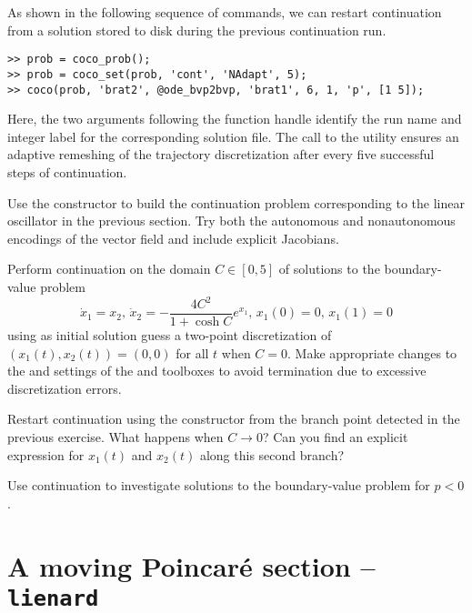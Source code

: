 As shown in the following sequence of commands, we can restart continuation from a solution stored to disk during the previous continuation run. 
\begin{lstlisting}[language=coco-highlight]
>> prob = coco_prob();
>> prob = coco_set(prob, 'cont', 'NAdapt', 5);
>> coco(prob, 'brat2', @ode_bvp2bvp, 'brat1', 6, 1, 'p', [1 5]);
\end{lstlisting}
Here, the two arguments following the  function handle identify the run name and integer label for the corresponding solution file. The call to the  utility ensures an adaptive remeshing of the trajectory discretization after every five successful steps of continuation.\\
\medskip

\begin{exercises}
\item Use the  constructor to build the continuation problem corresponding to the linear oscillator in the previous section. Try both the autonomous and nonautonomous encodings of the vector field and include explicit Jacobians.

\item Perform continuation on the domain $C\in[0,5]$ of solutions to the boundary-value problem
\[
\dot{x}_1=x_2,\,\dot{x}_2=-\frac{4C^2}{1+\cosh C}e^{x_1},\,x_1(0)=0,\,x_1(1)=0
\]
using as initial solution guess a two-point discretization of $(x_1(t),x_2(t))=(0,0)$ for all $t$ when $C=0$. Make appropriate changes to the  and  settings of the  and  toolboxes to avoid termination due to excessive discretization errors.

\item Restart continuation using the  constructor from the branch point detected in the previous exercise. What happens when $C\rightarrow 0$? Can you find an explicit expression for $x_1(t)$ and $x_2(t)$ along this second branch?

\item Use continuation to investigate solutions to the boundary-value problem for $p<0$.
\end{exercises}


\section{A moving Poincar\'{e} section -- \texttt{lienard}}

